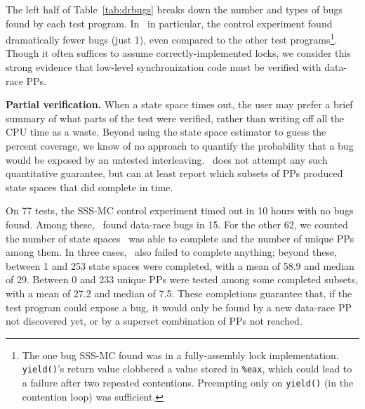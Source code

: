 The left half of Table~\ref{tab:drbugs}
breaks down the number and types of bugs found by each test program.
In \mxtest~in particular, the control experiment found dramatically fewer bugs (just 1),
even compared to the other test programs\footnote{
	The one bug SSS-MC found was in a fully-assembly lock implementation. {\tt yield()}'s return value clobbered a value stored in {\tt \%eax}, which could lead to a failure after two repeated contentions. Preempting only on {\tt yield()} (in the contention loop) was sufficient.}.
Though it often suffices to assume correctly-implemented locks,
we consider this strong evidence that low-level synchronization code must be verified with data-race PPs.

{\bf Partial verification.}
When a state space times out, the user may prefer a brief summary of what parts of the test were verified, rather than writing off all the CPU time as a waste.
Beyond using the state space estimator to guess the percent coverage,
we know of no approach to quantify the probability
that a bug would be exposed by an untested interleaving.
\quicksand~does not attempt any such quantitative guarantee,
but can at least report which subsets of PPs produced state spaces that did complete in time.

On 77 tests, the SSS-MC control experiment timed out in 10 hours with no bugs found.
Among these, \quicksand~found data-race bugs in 15.
For the other 62, we counted the number of state spaces \quicksand~was able to complete and the number of unique PPs among them.
In three cases, \quicksand~also failed to complete anything; beyond these,
between 1 and 253 state spaces were completed, with a mean of 58.9 and median of 29.
Between 0 and 233 unique PPs were tested among some completed subsets, with a mean of 27.2 and median of 7.5.
These completions guarantee that, if the test program could expose a bug,
it would only be found by a new data-race PP not discovered yet, or by a superset combination of PPs not reached.

